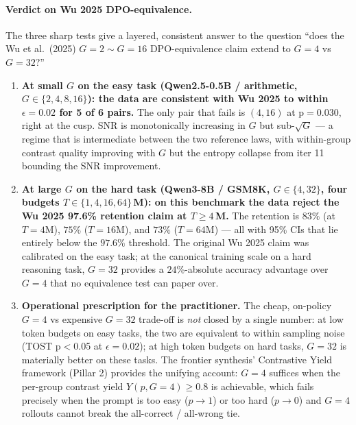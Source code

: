 \paragraph{Verdict on Wu 2025 DPO-equivalence.}
The three sharp tests give a layered, consistent answer to the
question ``does the Wu et al.\ (2025) $G{=}2 \sim G{=}16$
DPO-equivalence claim extend to $G{=}4$ vs $G{=}32$?''
\begin{enumerate}
\item \textbf{At small $G$ on the easy task (Qwen2.5-0.5B / arithmetic,
  $G \in \{2,4,8,16\}$): the data are consistent with Wu 2025 to
  within $\epsilon{=}0.02$ for 5 of 6 pairs.} The only pair that
  fails is $(4, 16)$ at p$=0.030$, right at the cusp. SNR is
  monotonically increasing in $G$ but sub-$\sqrt{G}$ --- a regime
  that is intermediate between the two reference laws, with
  within-group contrast quality improving with $G$ but the
  entropy collapse from iter 11 bounding the SNR improvement.
\item \textbf{At large $G$ on the hard task (Qwen3-8B / GSM8K,
  $G \in \{4, 32\}$, four budgets $T \in \{1, 4, 16, 64\}$\,M):
  on this benchmark the data reject the Wu 2025 97.6\% retention claim at
  $T \ge 4$\,M.} The retention is $83\%$ (at $T{=}4$M), $75\%$
  ($T{=}16$M), and $73\%$ ($T{=}64$M) --- all with 95\% CIs that lie
  entirely below the $97.6\%$ threshold. The original Wu 2025 claim
  was calibrated on the easy task; at the canonical training scale
  on a hard reasoning task, $G{=}32$ provides a $24$\%-absolute
  accuracy advantage over $G{=}4$ that no equivalence test can
  paper over.
\item \textbf{Operational prescription for the practitioner.}
  The cheap, on-policy $G{=}4$ vs expensive $G{=}32$ trade-off is
  \emph{not} closed by a single number: at low token budgets on easy
  tasks, the two are equivalent to within sampling noise (TOST
  p$<$0.05 at $\epsilon{=}0.02$); at high token budgets on hard
  tasks, $G{=}32$ is materially better on these tasks. The frontier synthesis'
  Contrastive Yield framework (Pillar 2) provides the unifying
  account: $G{=}4$ suffices when the per-group contrast yield
  $Y(p, G{=}4) \ge 0.8$ is achievable, which fails precisely when
  the prompt is too easy ($p \to 1$) or too hard ($p \to 0$) and
  $G{=}4$ rollouts cannot break the all-correct / all-wrong tie.
\end{enumerate}

